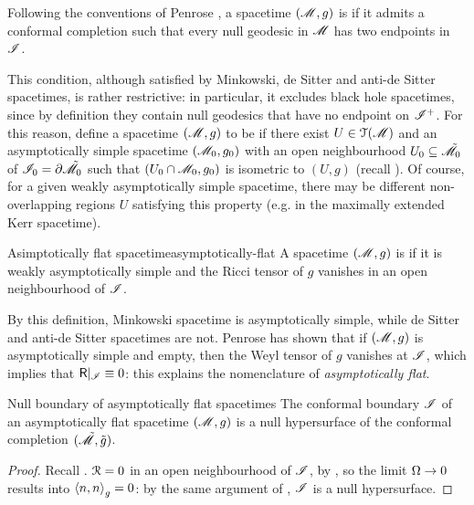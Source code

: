 Following the conventions of Penrose \cite{penrose-2}, a spacetime $ (\mathscr{M} , g) $ is  if it admits a conformal completion such that every null geodesic in $ \mathscr{M} $ has two endpoints in $ \mathscr{I} $.

This condition, although satisfied by Minkowski, de Sitter and anti-de Sitter spacetimes, is rather restrictive: in particular, it excludes black hole spacetimes, since by definition they contain null geodesics that have no endpoint on $ \mathscr{I}^+ $. For this reason, define a spacetime $ (\mathscr{M} , g) $ to be  if there exist $ U \in \EuScript{T}(\mathscr{M}) $ and an asymptotically simple spacetime $ (\mathscr{M}_0 , g_0) $ with an open neighbourhood $ U_0 \subseteq \tilde{\mathscr{M}}_0 $ of $ \mathscr{I}_0 = \partial \tilde{\mathscr{M}}_0 $ such that $ (U_0 \cap \mathscr{M}_0 , g_0) $ is isometric to $ (U , g) $ (recall ). Of course, for a given weakly asymptotically simple spacetime, there may be different non-overlapping regions $ U $ satisfying this property (e.g. in the maximally extended Kerr spacetime).

\begin{definition}{Asimptotically flat spacetime}{asymptotically-flat}
  A spacetime $ (\mathscr{M} , g) $ is  if it is weakly asymptotically simple and the Ricci tensor of $ g $ vanishes in an open neighbourhood of $ \mathscr{I} $.
\end{definition}

By this definition, Minkowski spacetime is asymptotically simple, while de Sitter and anti-de Sitter spacetimes are not.
Penrose \cite{penrose-3} has shown that if $ (\mathscr{M} , g) $ is asymptotically simple and empty, then the Weyl tensor of $ g $ vanishes at $ \mathscr{I} $, which implies that $ \textsf{R} \vert_{\mathscr{I}} \equiv 0 $: this explains the nomenclature of \emph{asymptotically flat}.

\begin{proposition}{Null boundary of asymptotically flat spacetimes}{}
  The conformal boundary $ \mathscr{I} $ of an asymptotically flat spacetime $ (\mathscr{M} , g) $ is a null hypersurface of the conformal completion $ (\tilde{\mathscr{M}} , \tilde{g}) $.
\end{proposition}

\begin{proofbox}
  \begin{proof}
    Recall . $ \EuScript{R} = 0 $ in an open neighbourhood of $ \mathscr{I} $, by , so the limit $ \Omega \rightarrow 0 $ results into $ \braket{n , n}_g = 0 $: by the same argument of , $ \mathscr{I} $ is a null hypersurface.
  \end{proof}
\end{proofbox}


